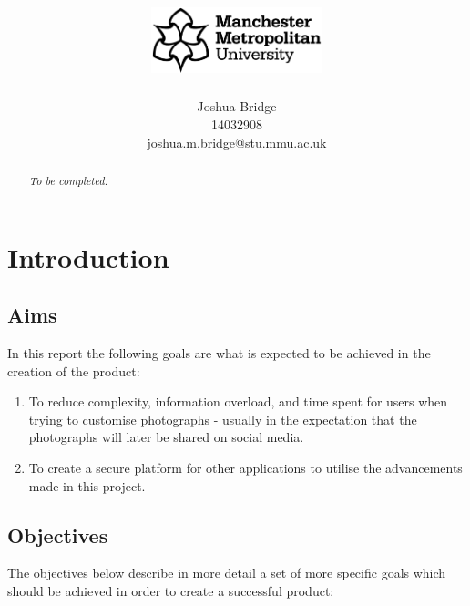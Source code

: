 \documentclass[a4paper,12pt]{report}
\title{\vspace{-2cm}\includegraphics[width=5cm]{mmu-white.pdf}\\\vspace{4cm}\reportTitle\vspace{1cm}}
\author{Joshua Bridge\\14032908\\joshua.m.bridge@stu.mmu.ac.uk}
\begin{document}
\maketitle

\doublespacing

\begin{abstract}
  \textit{To be completed.}
\end{abstract}

\onehalfspacing
\tableofcontents
\doublespacing

\listoffigures


\chapter{Introduction}

  \newpage

  \section{Aims}
    In this report the following goals are what is expected to be achieved in the creation of the product:

    \begin{enumerate}
      \item To reduce complexity, information overload, and time spent for users when trying to customise photographs - usually in the expectation that the photographs will later be shared on social media.
      \item To create a secure platform for other applications to utilise the advancements made in this project.
    \end{enumerate}

  \section{Objectives} \label{sec:objectives}
    The objectives below describe in more detail a set of more specific goals which should be achieved in order to create a successful product:
\end{document}
